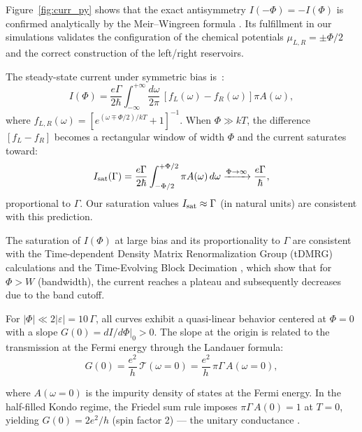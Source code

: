 \documentclass[preprint,1p]{elsarticle}
\begin{document}
Figure~\ref{fig:curr_py} shows that the exact antisymmetry $I(-\Phi) = -I(\Phi)$ is confirmed analytically by the Meir--Wingreen formula \cite{meir1992landauer}. Its fulfillment in our simulations validates the configuration of the chemical potentials $\mu_{L,R} = \pm\Phi/2$ and the correct construction of the left/right reservoirs.

The steady-state current under symmetric bias is~\cite{meir1992landauer}:
%
\begin{equation}
	I(\Phi) = \frac{e\Gamma}{2\hbar}
	\int_{-\infty}^{+\infty}\!\frac{d\omega}{2\pi}\,
	\left[f_L(\omega) - f_R(\omega)\right]
	\pi A(\omega),
	\label{eq:MeirWingreen}
\end{equation}
%
where $f_{L,R}(\omega) = [e^{(\omega \mp \Phi/2)/kT}+1]^{-1}$.
When $\Phi \gg kT$, the difference $[f_L - f_R]$ becomes a
rectangular window of width $\Phi$ and the current saturates
toward:
\begin{equation}
	I_{\rm sat}(\Gamma)
	= \frac{e\Gamma}{2\hbar}
	\int_{-\Phi/2}^{+\Phi/2}\pi A(\omega)\,d\omega
	\xrightarrow{\Phi\to\infty}
	\frac{e\Gamma}{\hbar},
	\label{eq:Isat}
\end{equation}
%
proportional to $\Gamma$.
Our saturation values $I_{\rm sat} \approx \Gamma$ (in natural
units) are consistent with this prediction.


The saturation of $I(\Phi)$ at large bias and its proportionality
to $\Gamma$ are consistent with the Time-dependent Density Matrix Renormalization Group (tDMRG) calculations \cite{boulat2008twofold} and the Time-Evolving Block Decimation \cite{roy2024reweighted},
which show that for $\Phi > W$ (bandwidth), the current
reaches a plateau and subsequently decreases due to the band cutoff.


For $|\Phi| \ll 2|\varepsilon| = 10\,\Gamma$, all curves
exhibit a quasi-linear behavior centered at $\Phi = 0$
with a slope $G(0) = dI/d\Phi|_0 > 0$.
The slope at the origin is related to the transmission
at the Fermi energy through the Landauer formula:
%
\begin{equation}
	G(0) = \frac{e^2}{h}\,\mathcal{T}(\omega=0)
	= \frac{e^2}{h}\,\pi\Gamma\,A(\omega=0),
\end{equation}

where $A(\omega=0)$ is the impurity density of states
at the Fermi energy. In the half-filled Kondo regime,
the Friedel sum rule imposes $\pi\Gamma\,A(0) = 1$ at $T=0$,
yielding $G(0) = 2e^2/h$ (spin factor 2)
— the unitary conductance \cite{goldhaber1998kondo}.
\end{document}
